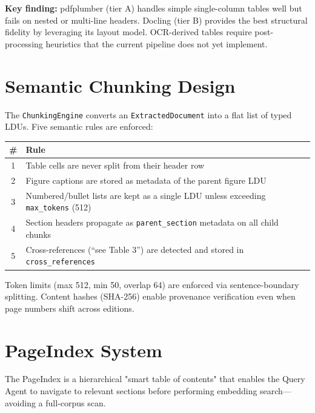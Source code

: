 \documentclass[12pt,a4paper]{article}
\begin{document}
\textbf{Key finding:} pdfplumber (tier A) handles simple single-column
tables well but fails on nested or multi-line headers.  Docling (tier B)
provides the best structural fidelity by leveraging its layout model.
OCR-derived tables require post-processing heuristics that the current
pipeline does not yet implement.


\section{Semantic Chunking Design}

The \texttt{ChunkingEngine} converts an \texttt{ExtractedDocument} into a
flat list of typed LDUs.  Five semantic rules are enforced:

\begin{center}
\begin{tabular}{cp{10cm}}
\toprule
\textbf{\#} & \textbf{Rule} \\
\midrule
1 & Table cells are never split from their header row \\
2 & Figure captions are stored as metadata of the parent figure LDU \\
3 & Numbered/bullet lists are kept as a single LDU unless exceeding
    \texttt{max\_tokens} (512) \\
4 & Section headers propagate as \texttt{parent\_section} metadata
    on all child chunks \\
5 & Cross-references (``see Table 3'') are detected and stored in
    \texttt{cross\_references} \\
\bottomrule
\end{tabular}
\end{center}

Token limits (max 512, min 50, overlap 64) are enforced via
sentence-boundary splitting.  Content hashes (SHA-256) enable
provenance verification even when page numbers shift across editions.


\section{PageIndex System}

The PageIndex is a hierarchical "smart table of contents" that enables
the Query Agent to navigate to relevant sections before performing
embedding search—avoiding a full-corpus scan.
\end{document}
